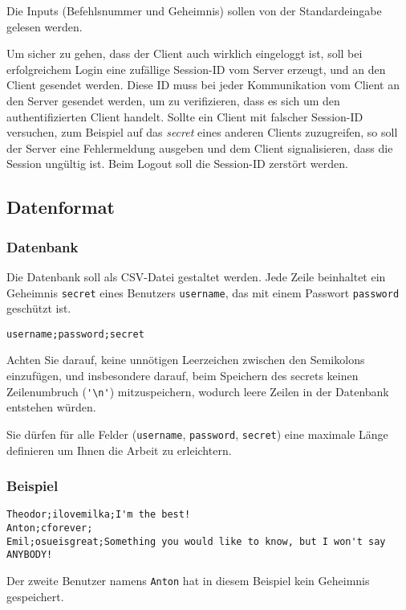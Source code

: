 Die Inputs (Befehlsnummer und Geheimnis) sollen von der Standardeingabe
gelesen werden.

Um sicher zu gehen, dass der Client auch wirklich eingeloggt ist, soll bei
erfolgreichem Login eine zufällige Session-ID vom Server erzeugt, und an den
Client gesendet werden. Diese ID muss bei jeder Kommunikation vom Client an den
Server gesendet werden, um zu verifizieren, dass es sich um den
authentifizierten Client handelt.  Sollte ein Client mit falscher Session-ID
versuchen, zum Beispiel auf das \textit{secret} eines anderen Clients
zuzugreifen, so soll der Server eine Fehlermeldung ausgeben und dem Client
signalisieren, dass die Session ungültig ist.  Beim Logout soll die Session-ID
zerstört werden.


\subsection*{Datenformat}

\subsubsection*{Datenbank}

Die Datenbank soll als CSV-Datei gestaltet werden. Jede Zeile beinhaltet ein
Geheimnis \texttt{secret} eines Benutzers \texttt{username}, das mit einem
Passwort \texttt{password} geschützt ist.

\begin{verbatim}
username;password;secret
\end{verbatim}

Achten Sie darauf, keine unnötigen Leerzeichen zwischen den Semikolons
einzufügen, und insbesondere darauf, beim Speichern des secrets keinen
Zeilenumbruch (\verb|'\n'|) mitzuspeichern, wodurch leere Zeilen in der
Datenbank entstehen würden.

Sie dürfen für alle Felder (\texttt{username}, \texttt{password},
\texttt{secret}) eine maximale Länge definieren um Ihnen die Arbeit zu
erleichtern.

\subsubsection*{Beispiel}

\begin{verbatim}
Theodor;ilovemilka;I'm the best!
Anton;cforever;
Emil;osueisgreat;Something you would like to know, but I won't say ANYBODY!
\end{verbatim}

Der zweite Benutzer namens \texttt{Anton} hat in diesem Beispiel kein Geheimnis
gespeichert.


\osueguidelinesthree


